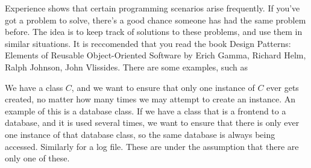 \documentclass[english, 11pt]{article}
\begin{document}
Experience shows that certain programming scenarios arise frequently. If you've got a problem to solve, there's a good chance someone has had the same problem before. The idea is to keep track of solutions to these problems, and use them in similar situations. It is reccomended that you read the book Design Patterns: Elements of Reusable Object-Oriented Software by Erich Gamma, Richard Helm, Ralph Johnson, John Vlissides. There are some examples, such as
\begin{defn}\label{Singleton}
  We have a class $C$, and we want to ensure that only one instance of $C$ ever gets created, no matter how many times we may attempt to create an instance. An example of this is a database class. If we have a class that is a frontend to a database, and it is used several times, we want to ensure that there is only ever one instance of that database class, so the same database is always being accessed. Similarly for a log file. These are under the assumption that there are only one of these.
\end{defn}
\end{document}
